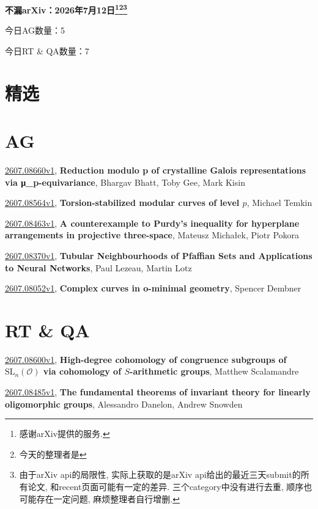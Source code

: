 \documentclass[9pt, a4paper]{article}
\theoremstyle{plain}
\theoremstyle{definition}
\theoremstyle{remark}
\newcommand{\arxiv}[3]{\href{https://arxiv.org/abs/#1}{#1}, \textbf{\textcolor{arxivblue}{#2}}, #3}
\newcommand{\AGnumber}{5}
\newcommand{\RTQAnumber}{7}
\newcommand{\NewestDate}{2026年7月12日}
\newcommand{\todayarXiver}{} %
\begin{document}
\begin{center}
    \Huge\textbf{不漏arXiv：\NewestDate\footnote{感谢arXiv提供的服务.}\footnote{今天的整理者是\todayarXiver}\footnote{由于arXiv api的局限性, 实际上获取的是arXiv api给出的最近三天submit的所有论文, 和recent页面可能有一定的差异. 三个category中没有进行去重, 顺序也可能存在一定问题, 麻烦整理者自行增删.}} \\
\end{center}

\setcounter{section}{-1}

\begin{center}
    今日AG数量：\AGnumber
    
    今日RT \& QA数量：\RTQAnumber
    
\end{center}


\section{精选}


\section{AG}
\arxiv{2607.08660v1}{Reduction modulo p of crystalline Galois representations via μ_p-equivariance}{Bhargav Bhatt, Toby Gee, Mark Kisin}

\arxiv{2607.08564v1}{Torsion-stabilized modular curves of level $p$}{Michael Temkin}

\arxiv{2607.08463v1}{A counterexample to Purdy's inequality for hyperplane arrangements in projective three-space}{Mateusz Michałek, Piotr Pokora}

\arxiv{2607.08370v1}{Tubular Neighbourhoods of Pfaffian Sets and Applications to Neural Networks}{Paul Lezeau, Martin Lotz}

\arxiv{2607.08052v1}{Complex curves in o-minimal geometry}{Spencer Dembner}


\section{RT \& QA}
\arxiv{2607.08600v1}{High-degree cohomology of congruence subgroups of $\text{SL}_n(\mathcal{O})$ via cohomology of $S$-arithmetic groups}{Matthew Scalamandre}

\arxiv{2607.08485v1}{The fundamental theorems of invariant theory for linearly oligomorphic groups}{Alessandro Danelon, Andrew Snowden}
\end{document}
